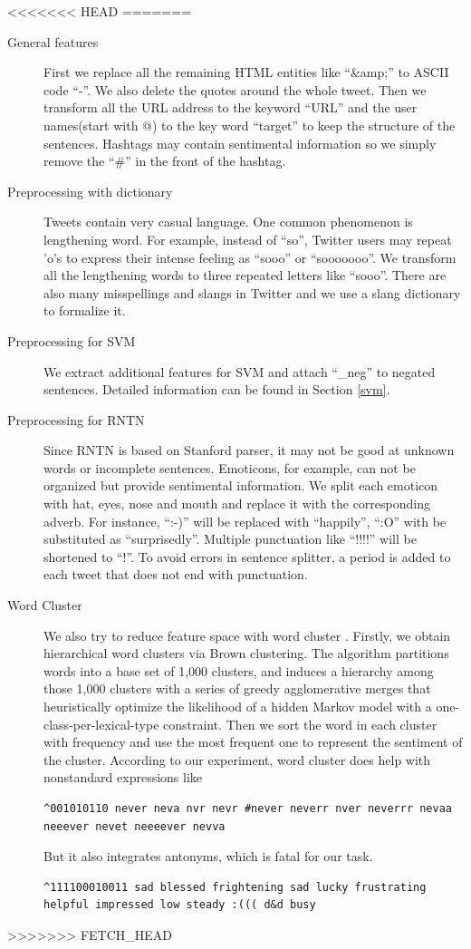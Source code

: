 <<<<<<< HEAD
=======
\begin{description}
\item[General features] First we replace all the remaining HTML entities like ``\&amp;'' to ASCII code ``-''. We also delete the quotes around the whole tweet. Then we transform all the URL address to the keyword ``URL'' and the user names(start with @) to the key word ``target'' to keep the structure of the sentences. Hashtags may contain sentimental information so we simply remove the ``\#'' in the front of the hashtag.
\item[Preprocessing with dictionary] Tweets contain very casual language. One common phenomenon is lengthening word. For example, instead of ``so'', Twitter users may repeat 'o's to express their intense feeling as ``sooo'' or ``sooooooo''. We transform all the lengthening words to three repeated letters like ``sooo''. There are also many misspellings and slangs in Twitter and we use a slang dictionary to formalize it.
\item[Preprocessing for SVM] We extract additional features for SVM and attach ``\_neg'' to negated sentences. Detailed information can be found in Section \ref{svm}.  %
\item[Preprocessing for RNTN] Since RNTN is based on Stanford parser, it may not be good at unknown words or incomplete sentences. Emoticons, for example, can not be organized but provide sentimental information. We split each emoticon with hat, eyes, nose and mouth and replace it with the corresponding adverb. For instance, ``:-)'' will be replaced with ``happily'', ``:O'' with be substituted as ``surprisedly''. Multiple punctuation like ``!!!!'' will be shortened to ``!''. To avoid errors in sentence splitter,  a period is added to each tweet that does not end with punctuation.
\item[Word Cluster] We also try to reduce feature space with word cluster \cite{Owoputi:2013}. Firstly, we obtain hierarchical word clusters via Brown clustering. The algorithm partitions words into a base set of 1,000 clusters, and induces a hierarchy among those 1,000 clusters with a series of greedy agglomerative merges that heuristically optimize the likelihood of a hidden Markov model with a one-class-per-lexical-type constraint. Then we sort the word in each cluster with frequency and use the most frequent one to represent the sentiment of the cluster. According to our experiment, word cluster does help with nonstandard expressions like 

\begin{verbatim}
^001010110 never neva nvr nevr #never neverr nver neverrr nevaa neeever nevet neeeever nevva
\end{verbatim}

But it also integrates antonyms, which is fatal for our task.
\begin{verbatim}
^111100010011 sad blessed frightening sad lucky frustrating helpful impressed low steady :((( d&d busy
\end{verbatim}



\end{description}
>>>>>>> FETCH_HEAD


